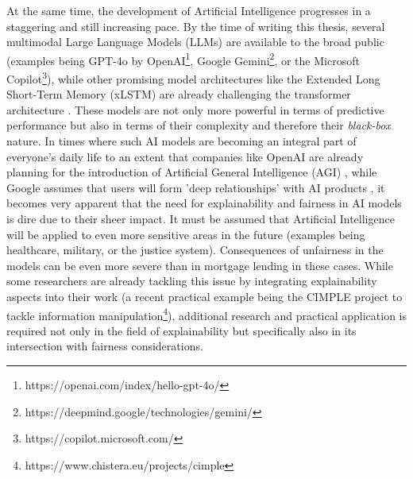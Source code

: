 At the same time, the development of Artificial Intelligence progresses in a staggering and still increasing pace. 
By the time of writing this thesis, several multimodal Large Language Models (LLMs) are available to the broad public (examples being GPT-4o by OpenAI\footnote{https://openai.com/index/hello-gpt-4o/}, Google Gemini\footnote{https://deepmind.google/technologies/gemini/}, or the Microsoft Copilot\footnote{https://copilot.microsoft.com/}), while other promising model architectures like the Extended Long Short-Term Memory (xLSTM) are already challenging the transformer architecture \parencite{beck2024}.
These models are not only more powerful in terms of predictive performance but also in terms of their complexity and therefore their \textit{black-box} nature.
In times where such AI models are becoming an integral part of everyone's daily life to an extent that companies like OpenAI are already planning for the introduction of Artificial General Intelligence (AGI) \parencite{Altman2023}, while Google assumes that users will form 'deep relationships' with AI products \parencite{Harris2024}, it becomes very apparent that the need for explainability and fairness in AI models is dire due to their sheer impact.
It must be assumed that Artificial Intelligence will be applied to even more sensitive areas in the future (examples being healthcare, military, or the justice system). Consequences of unfairness in the models can be even more severe than in mortgage lending in these cases.
While some researchers are already tackling this issue by integrating explainability aspects into their work (a recent practical example being the CIMPLE project to tackle information manipulation\footnote{https://www.chistera.eu/projects/cimple}), additional research and practical application is required not only in the field of explainability but specifically also in its intersection with fairness considerations.

